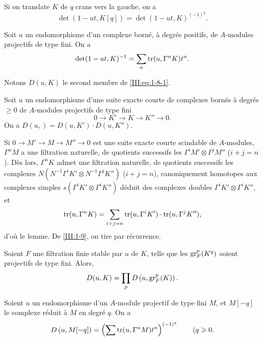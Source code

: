 \documentclass[oneside]{book}
\begin{document}
Si on translate $K$ de $q$ crans vers la gauche, on a 
\[
  \det(1-u t,K[q]) = \det(1-u t,K)^{(-1)^q} \text{.}
\]





\begin{proposition_}\label{III:1-8}
Soit $u$ un endomorphisme d'un complexe born\'e, \`a degr\'es positifs, de 
$A$-modules projectifs de type fini. On a \
\begin{equation}\label{III:eq:1-8-1}
  \det(1-u t,K)^{-1} = \sum_n \operatorname{tr}(u,\Gamma^n K) t^n \text{.}
\end{equation}
\end{proposition_}

Notons $D(u,K)$ le second membre de \eqref{III:eq:1-8-1}. 





\begin{lemma_}\label{III:1-9}
Soit $u$ un endomorphisme d'une suite exacte courte de complexes born\'es \`a 
degr\'es $\geqslant 0$ de $A$-modules projectifs de type fini 
\[
  0 \to K' \to K \to K'' \to 0 \text{.}
\]
On a $D(u,)=D(u,K')\cdot D(u,K'')$.
\end{lemma_}

Si $0\to M'\to M\to M''\to 0$ est une suite exacte courte scindable de 
$A$-modules, $\Gamma^n M$ a une filtration naturelle, de quotients successifs 
les $\Gamma^i M'\otimes \Gamma^j M''$ ($i+j=n$). D\`es lors, $\Gamma^n K$ admet 
une filtration naturelle, de quotients successifs les complexes 
$N(N^{-1} \Gamma^i K'\otimes N^{-1}\Gamma^j K'')$ ($i+j=n$), canoniquement 
homotopes aux complexes simples $s(\Gamma^i K'\otimes \Gamma^i K'')$ d\'eduit 
des complexes doubles $\Gamma^i K'\otimes \Gamma^i K''$, et 
\[
  \operatorname{tr}(u,\Gamma^n K) = \sum_{i+j=n} \operatorname{tr}(u,\Gamma^i K')\cdot \operatorname{tr}(u,\Gamma^j K'') \text{,}
\]
d'o\`u le lemme. De \ref{III:1-9}, on tire par r\'ecurrence. 





\begin{lemma_}\label{III:1-10}
Soient $F$ une filtration finie stable par $u$ de $K$, telle que les 
$\operatorname{gr}_F^p(K^q)$ soient projectifs de type fini. Alors, 
\[
  D(u,K) = \prod_p D\left(u,\operatorname{gr}_F^p(K)\right) \text{.}
\]
\end{lemma_}





\begin{lemma_}\label{III:1-11}
Soient $u$ un endomorphisme d'un $A$-module projectif de type fini $M$, et 
$M[-q]$ le complexe r\'eduit \`a $M$ en degr\'e $q$. On a 
\[
  D\left(u,M[-q]\right) = \left(\sum \operatorname{tr}(u,\Gamma^n M) t^n\right)^{(-1)^q} \qquad \text{($q\geqslant 0$.}
\]
\end{lemma_}
\end{document}
